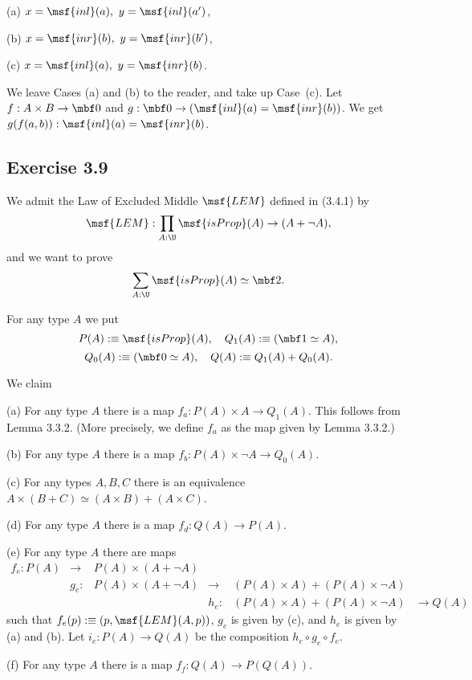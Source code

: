\documentclass[12pt]{article}
\begin{document}
(a) $x=\msf{inl}(a),\ y=\msf{inl}(a')$,

(b) $x=\msf{inr}(b),\ y=\msf{inr}(b')$,

(c) $x=\msf{inl}(a),\ y=\msf{inr}(b)$.

\nn We leave Cases (a) and (b) to the reader, and take up Case~(c). Let $f:A\times B\to\mbf0$ and $g:\mbf0\to(\msf{inl}(a)=\msf{inr}(b))$. We get $g(f(a,b)):\msf{inl}(a)=\msf{inr}(b)$.


\subsection{Exercise 3.9}

We admit the Law of Excluded Middle $\msf{LEM}$ defined in (3.4.1) by 
$$
\msf{LEM}:\prod_{A:\U}\msf{isProp}(A)\to(A+\neg A),
$$ 
and we want to prove 
\begin{equation}\label{e39}
\sum_{A:\U}\msf{isProp}(A)\simeq\mbf2.
\end{equation}

For any type $A$ we put 
$$
P(A):\equiv\msf{isProp}(A),\quad Q_1(A):\equiv(\mbf1\simeq A),
$$
$$
Q_0(A):\equiv(\mbf0\simeq A),\quad Q(A):\equiv Q_1(A)+Q_0(A).
$$ 

We claim

\nn(a) For any type $A$ there is a map $f_a:P(A)\times A\to Q_1(A)$. This follows from Lemma 3.3.2. (More precisely, we define $f_a$ as the map given by Lemma 3.3.2.)

\nn(b) For any type $A$ there is a map $f_b:P(A)\times\neg A\to Q_0(A)$.

\nn(c) For any types $A,B,C$ there is an equivalence $A\times(B+C)\simeq(A\times B)+(A\times C)$.

\nn(d) For any type $A$ there is a map $f_d:Q(A)\to P(A)$.

\nn(e) For any type $A$ there are maps 
$$
\begin{matrix}
f_e:P(A)&\to &P(A)\times(A+\neg A)\\ 
        &g_e:&P(A)\times(A+\neg A)&\to &(P(A)\times A)+(P(A)\times\neg A)\\ 
        &    &                    &h_e:&(P(A)\times A)+(P(A)\times\neg A)&\to Q(A)
\end{matrix}
$$ 
such that $f_e(p):\equiv(p,\msf{LEM}(A,p))$, $g_e$ is given by (c), and $h_e$ is given by (a) and (b). Let $i_e:P(A)\to Q(A)$ be the composition $h_e\circ g_e\circ f_e$.

\nn(f) For any type $A$ there is a map $f_f:Q(A)\to P(Q(A))$.
\end{document}

